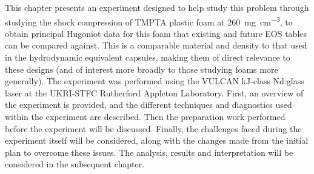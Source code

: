 This chapter presents an experiment designed to help study this problem through studying the shock compression of TMPTA plastic foam at 260~\unit{\milli\gram\per\centi\meter\cubed}, to obtain principal Hugoniot data for this foam that existing and future EOS tables can be compared against. This is a comparable material and density to that used in the hydrodynamic equivalent capsules, making them of direct relevance to these designs (and of interest more broadly to those studying foams more generally). The experiment was performed using the VULCAN kJ-class Nd:glass laser at the UKRI-STFC Rutherford Appleton Laboratory. First, an overview of the experiment is provided, and the different techniques and diagnostics used within the experiment are described. Then the preparation work performed before the experiment will be discussed. Finally, the challenges faced during the experiment itself will be considered, along with the changes made from the initial plan to overcome these issues. The analysis, results and interpretation will be considered in the subsequent chapter.


